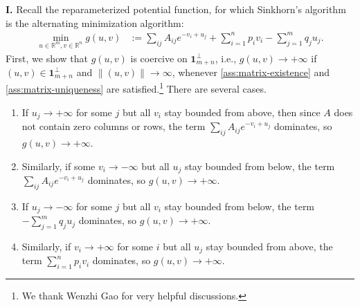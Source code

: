\textbf{I.} Recall the reparameterized potential function, for which Sinkhorn's
algorithm is the alternating minimization algorithm:
\begin{align*}
\min_{u\in\mathbb{R}^{m},v\in\mathbb{R}^{n}}g(u,v) & :=\sum_{ij}A_{ij}e^{-v_{i}+u_{j}}+\sum_{i=1}^{n}p_{i}v_{i}-\sum_{j=1}^{m}q_{j}u_{j}.
\end{align*}
 First, we show that $g(u,v)$ is coercive  on $\mathbf{1}_{m+n}^\perp$, i.e., $g(u,v)\rightarrow +\infty$ if $(u,v)\in \mathbf{1}_{m+n}^\perp$ and $\|(u,v)\|\rightarrow \infty$, whenever \cref{ass:matrix-existence} and \cref{ass:matrix-uniqueness} are satisfied.\footnote{We thank Wenzhi Gao for very helpful discussions.} There are several cases.
\begin{enumerate}
     \item If $u_j \rightarrow +\infty$ for some $j$ but all $v_i$ stay bounded from above, then since $A$ does not contain zero columns or rows, the term $\sum_{ij}A_{ij}e^{-v_{i}+u_{j}}$ dominates, so $g(u,v)\rightarrow +\infty$.

     \item  Similarly, if some $v_i \rightarrow -\infty$ but all $u_j$ stay bounded from below, the term $\sum_{ij}A_{ij}e^{-v_{i}+u_{j}}$ dominates, so $g(u,v)\rightarrow +\infty$.

     \item If $u_j \rightarrow -\infty$ for some $j$ but all $v_i$ stay bounded from below, the term $-\sum_{j=1}^{m}q_{j}u_{j}$ dominates, so $g(u,v)\rightarrow +\infty$.

     \item Similarly, if $v_i \rightarrow+\infty$ for some $i$ but all $u_j$ stay bounded from above, the term $\sum_{i=1}^{n}p_{i}v_{i}$ dominates, so $g(u,v)\rightarrow +\infty$.


\end{enumerate}
